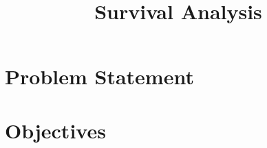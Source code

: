 \documentclass[12t]{article}
\title{Survival Analysis}
\begin{document}
\maketitle

\section{Problem Statement}
\section{Objectives}
\end{document}
